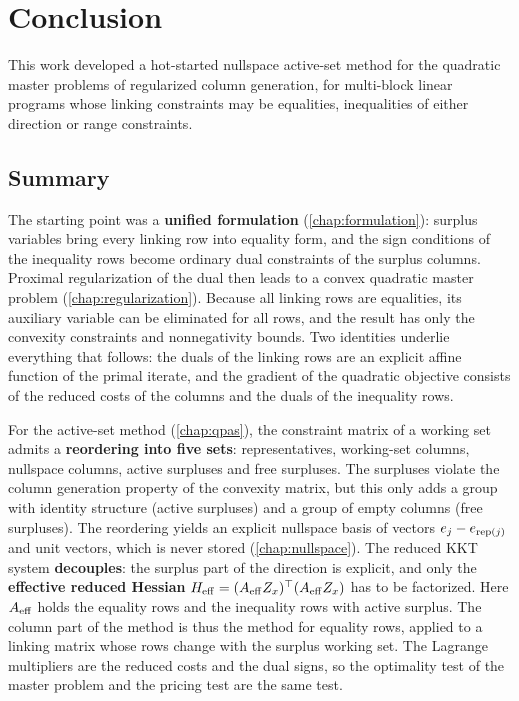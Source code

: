 \chapter{Conclusion}
\label{chap:conclusion}

This work developed a hot-started nullspace active-set method for the quadratic master
problems of regularized column generation, for multi-block linear programs whose linking
constraints may be equalities, inequalities of either direction or range constraints.

\section{Summary}

The starting point was a \textbf{unified formulation} (\cref{chap:formulation}): surplus
variables bring every linking row into equality form, and the sign conditions of the
inequality rows become ordinary dual constraints of the surplus columns. Proximal
regularization of the dual then leads to a convex quadratic master problem
(\cref{chap:regularization}). Because all linking rows are equalities, its auxiliary variable
can be eliminated for all rows, and the result has only the convexity constraints and
nonnegativity bounds. Two identities underlie everything that follows: the duals of the
linking rows are an explicit affine function of the primal iterate, and the gradient of the
quadratic objective consists of the reduced costs of the columns and the duals of the
inequality rows.

\medskip

For the active-set method (\cref{chap:qpas}), the constraint matrix of a working set admits a
\textbf{reordering into five sets}: representatives, working-set columns, nullspace columns,
active surpluses and free surpluses. The surpluses violate the column generation property of
the convexity matrix, but this only adds a group with identity structure (active surpluses)
and a group of empty columns (free surpluses). The
reordering yields an explicit nullspace basis of vectors $e_j - e_{\operatorname{rep}(j)}$ and unit vectors,
which is never stored (\cref{chap:nullspace}). The reduced KKT system \textbf{decouples}: the
surplus part of the direction is explicit, and only the \textbf{effective reduced Hessian}
$H_{\mathrm{eff}} = (A_{\mathrm{eff}} Z_x)^\top(A_{\mathrm{eff}} Z_x)$ has to be factorized. Here $A_{\mathrm{eff}}$ holds the equality rows
and the inequality rows with active surplus. The column part of the method is thus the method
for equality rows, applied to a linking matrix whose rows change with the surplus working set.
The Lagrange multipliers are the reduced costs and the dual signs, so the optimality test of
the master problem and the pricing test are the same test.

